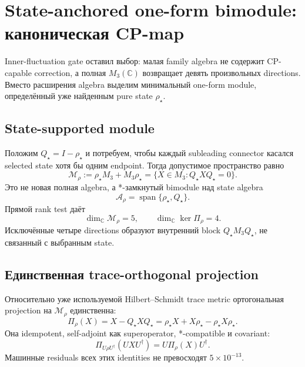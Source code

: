 \chapter{State-anchored one-form bimodule: каноническая CP-map}

Inner-fluctuation gate оставил выбор: малая family algebra не содержит
CP-capable correction, а полная \(M_3(\mathbb C)\) возвращает девять
произвольных directions. Вместо расширения algebra выделим минимальный
one-form module, определённый уже найденным pure state \(\rho_\star\).

\section{State-supported module}

Положим \(Q_\star=I-\rho_\star\) и потребуем, чтобы каждый subleading
connector касался selected state хотя бы одним endpoint. Тогда допустимое
пространство равно
\begin{equation}
 \mathcal M_{\rho}:=
 \rho_\star M_3+M_3\rho_\star
 =\{X\in M_3:Q_\star XQ_\star=0\}.
\end{equation}
Это не новая полная algebra, а *-замкнутый bimodule над state algebra
\begin{equation}
 \mathcal A_\rho=
 \operatorname{span}\{\rho_\star,Q_\star\}.
\end{equation}
Прямой rank test даёт
\begin{equation}
 \dim_{\mathbb C}\mathcal M_\rho=5,
 \qquad
 \dim_{\mathbb C}\ker\Pi_\rho=4.
\end{equation}
Исключённые четыре directions образуют внутренний block
\(Q_\star M_3Q_\star\), не связанный с выбранным state.

\section{Единственная trace-orthogonal projection}

Относительно уже используемой Hilbert--Schmidt trace metric ортогональная
projection на \(\mathcal M_\rho\) единственна:
\begin{equation}
 \boxed{
 \Pi_\rho(X)=X-Q_\star XQ_\star
 =\rho_\star X+X\rho_\star-\rho_\star X\rho_\star.}
\end{equation}
Она idempotent, self-adjoint как superoperator, *-compatible и covariant:
\begin{equation}
 \Pi_{U\rho U^\dagger}(UXU^\dagger)
 =U\Pi_\rho(X)U^\dagger.
\end{equation}
Машинные residuals всех этих identities не превосходят
\(5\times10^{-13}\).

